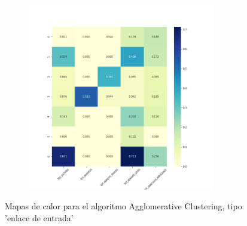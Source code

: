 \begin{figure}[H]
\begin{subfigure}{.5\textwidth}
\end{subfigure}
\begin{subfigure}{.5\textwidth}
  \centering
  \includegraphics[width=0.9\textwidth]{imagenes/case1/agglomerative/heatmaps/hm_agglomerative_case1_entrada_k7.png}
\end{subfigure}
\caption{Mapas de calor para el algoritmo Agglomerative Clustering, tipo 'enlace de entrada'}
\label{fig:hm-km}
\end{figure}

